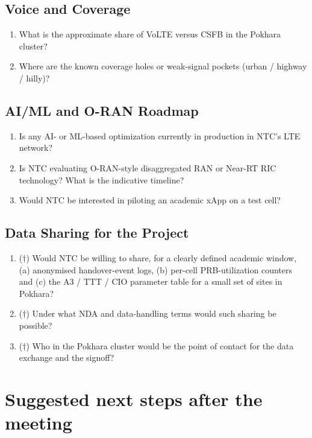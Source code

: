 \documentclass[11pt,a4paper]{article}
\begin{document}
\subsection{Voice and Coverage}

\begin{enumerate}[leftmargin=*,resume]
    \item What is the approximate share of VoLTE versus CSFB in the
    Pokhara cluster?
    \item Where are the known coverage holes or weak-signal pockets
    (urban / highway / hilly)?
\end{enumerate}

\subsection{AI/ML and O-RAN Roadmap}

\begin{enumerate}[leftmargin=*,resume]
    \item Is any AI- or ML-based optimization currently in production
    in NTC's LTE network?
    \item Is NTC evaluating O-RAN-style disaggregated RAN or Near-RT
    RIC technology? What is the indicative timeline?
    \item Would NTC be interested in piloting an academic xApp on a
    test cell?
\end{enumerate}

\subsection{Data Sharing for the Project}

\begin{enumerate}[leftmargin=*,resume]
    \item ($\dagger$) Would NTC be willing to share, for a clearly
    defined academic window, (a) anonymised handover-event logs,
    (b) per-cell PRB-utilization counters and (c) the A3 / TTT / CIO
    parameter table for a small set of sites in Pokhara?
    \item ($\dagger$) Under what NDA and data-handling terms would such
    sharing be possible?
    \item ($\dagger$) Who in the Pokhara cluster would be the point of
    contact for the data exchange and the signoff?
\end{enumerate}

\section{Suggested next steps after the meeting}
\end{document}
